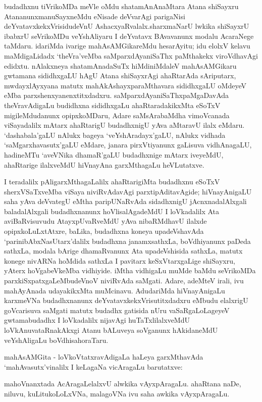 budadhxnu tiVrikoMDa meVle oMdu shatamAnAnaMtara Atana shiSayxru Atananunx\break manuSayxneMdu eNisade deVvarAgi parigaNisi deYvatavxkekxVrisidudeVnU AshacxyaRvalalx.\break sharxmaNarU lwkika shiSayxrU ibabxrU seVrikoMDu veYshAliyaru I deYvatavx BAva\-vanunx modalu AcaraNege taMdaru. idariMda ivarige mahAsAMGikareMdu hesarAyitu; idu elolxV kelavu maMdigaLidadx `theVra'veMba saMparxdAyaniSaThx paMthakekx viroVdha\-vAgi edidxtu. nAlakxneya shatamAnadaSuTx hiMdiniMdaleV mahAsAMGikaru gwtamana sididhx\-gaLU hAgU Atana shiSayxrAgi ahaRtarAda sAriputarx, mwdayxlAyxyana matutx mahA\-kAshayxparaMthavara sididhxgaLU oMdeyeV eMba parxshenxyanenxtitxdadxru. saMparxdAyaniSaThx\break paMgaDavAda theVravAdigaLu budidhxna sididhxgaLu ahaRtaradakikxMta eSoTxV migileMdu\-danunx opipxkoMDaru, Adare saMsArabaMdha vimoVcanada viSayadalilx mAtarx ahaRtarigU budadhxnigU yAva aMtaravU ilalx eMdaru. `dashabala'gaLU nAlukx bageya `veYshAradayx'gaLU, nAlukx vidhada `saMgarxhavasutx'gaLU eMdare, janara pirxVtiyanunx gaLisuva vidhAnagaLU, hadineMTu `aveVNika dhamaR'gaLU budadhxnige mAtarx iveyeMdU, ahaRtarige ilalxveMdU hiVnayAna garxMthagaLu heVLutatxve.

I teradalilx pAligarxMthagaLalilx ahaRtarigiMta budadhxnu eSoTxV sherxVSaTxveMba viSaya niviRvAdavAgi parxtipAditavAgide; hiVnayAnigaLU saha yAva deVvategU eMtha paripUNaRvAda sidadhxnigU  jAcnxnadalAlxgali baladalAlxgali budadhxnanunx hoVlisalAgadeMdU I loVkadalilx Ata aviBaRvisuvudu AtayxpUvaRveMdU yAva nibaRMdhavU ilalxde opipxkoLuLxtAtxre, baLika, budadhxna koneya upadeVshavAda `parinibAbxNasUtarx'dalilx budadhxna janamxsathxLa, boVdhiyanunx paDeda sathxLa, modala bArige dhamaRvanunx Ata upadeVshisida sathxLa, matutx konege nivARNa hoMdida sathxLa I pavitarx keSxVtarxgaLige shiSayxru, yAterx hoVgabeVkeMba vidhiyide. iMtha vidhigaLu muMde baMdu seVrikoMDa parxkiSxpatxgaLeMbudeVnoV niviRvAda saMgati. Adare, adeMteV irali, ivu mahAyAnada udayakikxMta muMcinavu. AdudariMda hiVnayAnigaLu karxmeVNa budadhxnanunx deYvatavxkekxVrisutitxdadxru eMbudu elalxrigU goVcarisuva saMgati matutx budadhx gatisida nUru vaSaRgaLoLageyeV gwtamabudadhx I loVkadalilx nijavAgi huTaTxlilalxveMdU loVkAnuvataRnakAkxgi Atanu bALuveya soVganunx hAkidaneMdU veYshAligaLu boVdhisahoraTaru.

mahAsAMGita - loVkoVtatxravAdigaLa haLeya garxMthavAda `mahAvasutx'vinalilx I keLagaNa vicAragaLu barutatxve:

mahoVnanxtada AcAragaLelalxvU alwkika vAyxpAragaLu. ahaRtana naDe, niluvu, kuLitukoLoLxVNa, malagoVNa ivu saha awkika vAyxpAragaLu.

